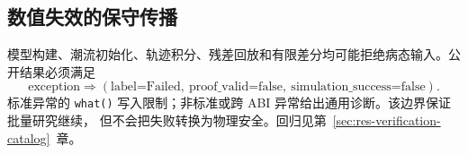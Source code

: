 \subsection{数值失效的保守传播}

模型构建、潮流初始化、轨迹积分、残差回放和有限差分均可能拒绝病态输入。公开结果必须满足
\begin{equation}
 \text{exception}\Rightarrow
 (\text{label=Failed},\ \text{proof\_valid=false},\
  \text{simulation\_success=false}).
\end{equation}
标准异常的 \texttt{what()} 写入限制；非标准或跨 ABI 异常给出通用诊断。该边界保证批量研究继续，
但不会把失败转换为物理安全。回归见第~\ref{sec:res-verification-catalog}~章。
